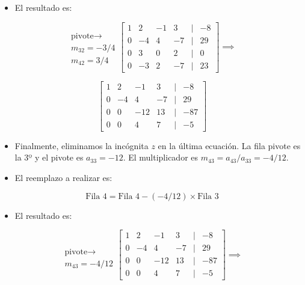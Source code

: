 \documentclass[openany]{book}
\providecommand{\tightlist}{%
  \setlength{\itemsep}{0pt}\setlength{\parskip}{0pt}}
\begin{document}
\begin{itemize}
\tightlist
\item
  El resultado es:
\end{itemize}

\[
\begin{matrix}
 \\ \text{pivote} \rightarrow \\ m_{32} = -3/4 \\ m_{42} = 3/4
\end{matrix}
\begin{bmatrix}
1 & 2 & -1 & 3 &|& -8\\
0 & -4 & 4 & -7 &|& 29\\
0 & 3 & 0 & 2 &|& 0\\
0 & -3 & 2 & -7 &|& 23  
\end{bmatrix}
\implies
\]

\[
\begin{bmatrix}
1 & 2 & -1 & 3 &|& -8\\
0 & -4 & 4 & -7 &|& 29\\
0 & 0 & -12 & 13 &|& -87\\
0 & 0 & 4 & 7 &|& -5  
\end{bmatrix}
\]

\begin{itemize}
\tightlist
\item
  Finalmente, eliminamos la incógnita \(z\) en la última ecuación. La fila pivote es la 3º y el pivote es \(a_{33}=-12\). El multiplicador es \(m_{43}=a_{43}/a_{33}=-4/12\).
\item
  El reemplazo a realizar es:
\end{itemize}

\[\text{Fila } 4 = \text{Fila } 4 - (-4/12) \times \text{Fila } 3\]

\begin{itemize}
\tightlist
\item
  El resultado es:
\end{itemize}

\[
\begin{matrix}
\\ \\ \text{pivote} \rightarrow \\ m_{43} = -4/12
\end{matrix}
\begin{bmatrix}
1 & 2 & -1 & 3 &|& -8\\
0 & -4 & 4 & -7 &|& 29\\
0 & 0 & -12 & 13 &|& -87\\
0 & 0 & 4 & 7 &|& -5  
\end{bmatrix}
\implies
\]
\end{document}

